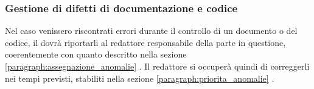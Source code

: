 

\subsubsection{Gestione di difetti di documentazione e codice}
Nel caso venissero riscontrati errori durante il controllo di un documento o del codice, il \roleVerifier{} dovrà riportarli al redattore responsabile della parte in questione, coerentemente con quanto descritto nella sezione \ref{paragraph:assegnazione_anomalie} . Il redattore si occuperà quindi di correggerli nei tempi previsti, stabiliti nella sezione \ref{paragraph:priorita_anomalie} .

